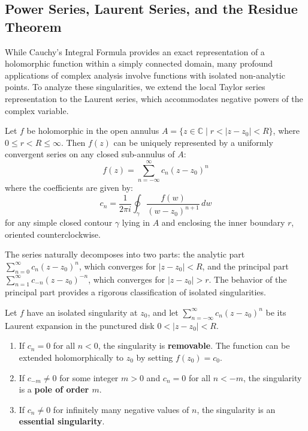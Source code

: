 \subsection{Power Series, Laurent Series, and the Residue Theorem}

While Cauchy's Integral Formula provides an exact representation of a holomorphic function within a simply connected domain, many profound applications of complex analysis involve functions with isolated non-analytic points. To analyze these singularities, we extend the local Taylor series representation to the Laurent series, which accommodates negative powers of the complex variable.

\begin{theorem}
Let $f$ be holomorphic in the open annulus $A = \{z \in \mathbb{C} \mid r < |z - z_0| < R\}$, where $0 \le r < R \le \infty$. Then $f(z)$ can be uniquely represented by a uniformly convergent series on any closed sub-annulus of $A$:
$$f(z) = \sum_{n=-\infty}^\infty c_n (z - z_0)^n$$
where the coefficients are given by:
$$c_n = \frac{1}{2\pi i} \oint_\gamma \frac{f(w)}{(w - z_0)^{n+1}} \, dw$$
for any simple closed contour $\gamma$ lying in $A$ and enclosing the inner boundary $r$, oriented counterclockwise.
\end{theorem}

The series naturally decomposes into two parts: the analytic part $\sum_{n=0}^\infty c_n (z - z_0)^n$, which converges for $|z - z_0| < R$, and the principal part $\sum_{n=1}^\infty c_{-n} (z - z_0)^{-n}$, which converges for $|z - z_0| > r$. The behavior of the principal part provides a rigorous classification of isolated singularities.

\begin{definition}
Let $f$ have an isolated singularity at $z_0$, and let $\sum_{n=-\infty}^\infty c_n (z - z_0)^n$ be its Laurent expansion in the punctured disk $0 < |z - z_0| < R$. 
\begin{enumerate}
    \item If $c_n = 0$ for all $n < 0$, the singularity is \textbf{removable}. The function can be extended holomorphically to $z_0$ by setting $f(z_0) = c_0$.
    \item If $c_{-m} \neq 0$ for some integer $m > 0$ and $c_n = 0$ for all $n < -m$, the singularity is a \textbf{pole of order $m$}. 
    \item If $c_n \neq 0$ for infinitely many negative values of $n$, the singularity is an \textbf{essential singularity}.
\end{enumerate}
\end{definition}

